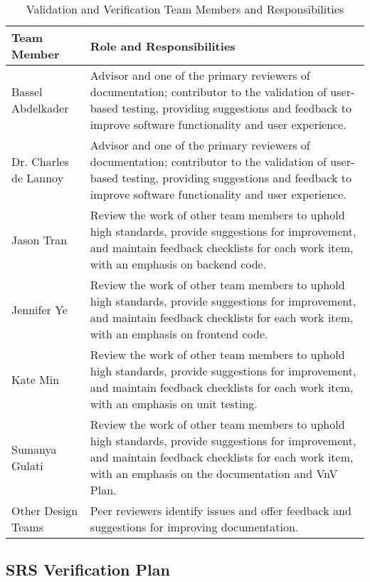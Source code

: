 \documentclass[12pt, titlepage]{article}
\begin{document}
\begin{table}[H]
  \centering
  \caption{Validation and Verification Team Members and Responsibilities}
  \label{table:vnv_team}
  \begin{tabularx}{\textwidth}{|>{\centering\arraybackslash}p{}|>{\centering\arraybackslash}X|}
      \hline
      \textbf{Team Member} & \textbf{Role and Responsibilities} \\
      \hline
      Bassel Abdelkader & Advisor and one of the primary reviewers of
      documentation; contributor to the validation of user-based testing,
      providing suggestions and feedback to improve software functionality and
      user experience. \\
      \hline
      Dr. Charles de Lannoy & Advisor and one of the primary reviewers of
      documentation; contributor to the validation of user-based testing,
      providing suggestions and feedback to improve software functionality and
      user experience. \\
      \hline
      Jason Tran & Review the work of other team members to uphold high
      standards, provide suggestions for improvement, and maintain feedback
      checklists for each work item, with an emphasis on backend code. \\
      \hline
      Jennifer Ye & Review the work of other team members to uphold high
      standards, provide suggestions for improvement, and maintain feedback
      checklists for each work item, with an emphasis on frontend code. \\
      \hline
      Kate Min & Review the work of other team members to uphold high standards,
      provide suggestions for improvement, and maintain feedback checklists for
      each work item, with an emphasis on unit testing. \\
      \hline
      Sumanya Gulati & Review the work of other team members to uphold high
      standards, provide suggestions for improvement, and maintain feedback
      checklists for each work item, with an emphasis on the documentation and
      VnV Plan. \\
      \hline
      Other Design Teams & Peer reviewers identify issues and offer feedback and
      suggestions for improving documentation. \\
      \hline
  \end{tabularx}
\end{table}

\subsection{SRS Verification Plan}
\end{document}
